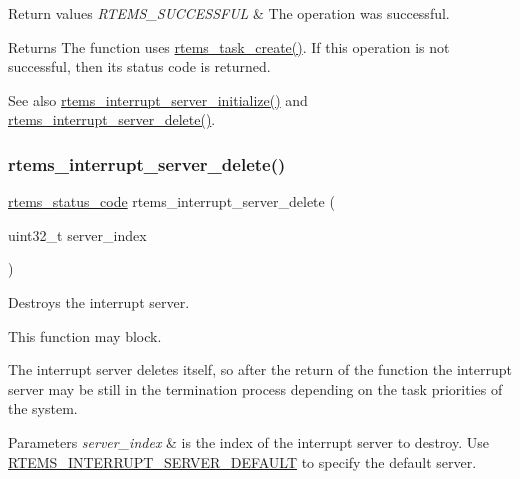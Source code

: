\begin{DoxyRetVals}{Return values}
{\em R\+T\+E\+M\+S\+\_\+\+S\+U\+C\+C\+E\+S\+S\+F\+UL} & The operation was successful.\\
\hline
\end{DoxyRetVals}
\begin{DoxyReturn}{Returns}
The function uses \mbox{\hyperlink{group__ClassicTasks_gabffda1c2301962f0ae5af042ac0bba62}{rtems\+\_\+task\+\_\+create()}}. If this operation is not successful, then its status code is returned.
\end{DoxyReturn}
\begin{DoxySeeAlso}{See also}
\mbox{\hyperlink{group__rtems__interrupt__extension_ga7e728143679eb46d7c4792ea401a4335}{rtems\+\_\+interrupt\+\_\+server\+\_\+initialize()}} and \mbox{\hyperlink{group__rtems__interrupt__extension_gaa1093bab07e2fe4be3ea1025ea5d15a7}{rtems\+\_\+interrupt\+\_\+server\+\_\+delete()}}. 
\end{DoxySeeAlso}
\mbox{\label{group__rtems__interrupt__extension_gaa1093bab07e2fe4be3ea1025ea5d15a7}} 
\subsubsection{\texorpdfstring{rtems\_interrupt\_server\_delete()}{rtems\_interrupt\_server\_delete()}}
{\footnotesize\ttfamily \mbox{\hyperlink{group__ClassicStatus_ga545d41846817eaba6143d52ee4d9e9fe}{rtems\+\_\+status\+\_\+code}} rtems\+\_\+interrupt\+\_\+server\+\_\+delete (\begin{DoxyParamCaption}\item[{uint32\+\_\+t}]{server\+\_\+index }\end{DoxyParamCaption})}



Destroys the interrupt server. 

This function may block.

The interrupt server deletes itself, so after the return of the function the interrupt server may be still in the termination process depending on the task priorities of the system.


\begin{DoxyParams}{Parameters}
{\em server\+\_\+index} & is the index of the interrupt server to destroy. Use \mbox{\hyperlink{group__rtems__interrupt__extension_ga756752bdffd9e7115d4395d53248b6c8}{R\+T\+E\+M\+S\+\_\+\+I\+N\+T\+E\+R\+R\+U\+P\+T\+\_\+\+S\+E\+R\+V\+E\+R\+\_\+\+D\+E\+F\+A\+U\+LT}} to specify the default server.\\
\hline
\end{DoxyParams}

